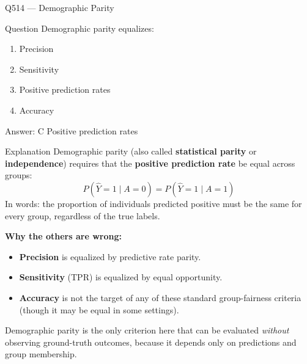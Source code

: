 \documentclass[aspectratio=169,8pt]{beamer}
\begin{document}
\begin{frame}{Q514 --- Demographic Parity}
	\begin{block}{Question}
		Demographic parity equalizes:
		\begin{enumerate}
			\item Precision
			\item Sensitivity
			\item Positive prediction rates
			\item Accuracy
		\end{enumerate}
	\end{block}
	\begin{exampleblock}{Answer: C}
		Positive prediction rates
	\end{exampleblock}
	\begin{block}{Explanation}
		Demographic parity (also called \textbf{statistical parity} or
		\textbf{independence}) requires that the \textbf{positive prediction rate}
		be equal across groups:
		\[
		P(\hat{Y} = 1 \mid A = 0) = P(\hat{Y} = 1 \mid A = 1)
		\]
		In words: the proportion of individuals predicted positive must be the same
		for every group, regardless of the true labels.
		
		\textbf{Why the others are wrong:}
		\begin{itemize}
			\item \textbf{Precision} is equalized by predictive rate parity.
			\item \textbf{Sensitivity} (TPR) is equalized by equal opportunity.
			\item \textbf{Accuracy} is not the target of any of these standard
			group-fairness criteria (though it may be equal in some settings).
		\end{itemize}
		Demographic parity is the only criterion here that can be evaluated
		\emph{without} observing ground-truth outcomes, because it depends only on
		predictions and group membership.
	\end{block}
\end{frame}
\end{document}
